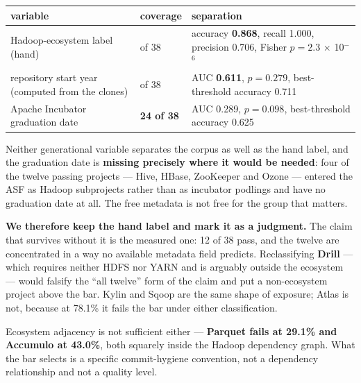 \documentclass[conference]{IEEEtran}
\begin{document}
\begin{table}[htbp]
\centering
\begingroup\footnotesize\setlength{\tabcolsep}{3pt}
\begin{tabular}{>{\raggedright\arraybackslash}p{}>{\raggedright\arraybackslash}p{}>{\raggedright\arraybackslash}p{}}
\toprule
\textbf{variable} & \textbf{coverage} & \textbf{separation} \\
\midrule
Hadoop-\allowbreak{}ecosystem label (hand) & 38 of 38 & accuracy \textbf{0.868}, recall 1.000, precision 0.706, Fisher $p = 2.3$ $\times$ 10$^{-\allowbreak{}}$$^{6}$ \\
repository start year (computed from the clones) & 38 of 38 & AUC \textbf{0.611}, $p = 0.279$, best-\allowbreak{}threshold accuracy 0.711 \\
Apache Incubator graduation date & \textbf{24 of 38} & AUC 0.289, $p = 0.098$, best-\allowbreak{}threshold accuracy 0.625 \\
\bottomrule
\end{tabular}
\endgroup
\end{table}

Neither generational variable separates the corpus as well as the hand label, and the graduation date is \textbf{missing precisely where it would be needed}: four of the twelve passing projects --- Hive, HBase, ZooKeeper and Ozone --- entered the ASF as Hadoop subprojects rather than as incubator podlings and have no graduation date at all. The free metadata is not free for the group that matters.

\textbf{We therefore keep the hand label and mark it as a judgment.} The claim that survives without it is the measured one: 12 of 38 pass, and the twelve are concentrated in a way no available metadata field predicts. Reclassifying \textbf{Drill} --- which requires neither HDFS nor YARN and is arguably outside the ecosystem --- would falsify the ``all twelve'' form of the claim and put a non-ecosystem project above the bar. Kylin and Sqoop are the same shape of exposure; Atlas is not, because at 78.1\% it fails the bar under either classification.

Ecosystem adjacency is not sufficient either --- \textbf{Parquet fails at 29.1\% and Accumulo at 43.0\%}, both squarely inside the Hadoop dependency graph. What the bar selects is a specific commit-hygiene convention, not a dependency relationship and not a quality level.
\end{document}
